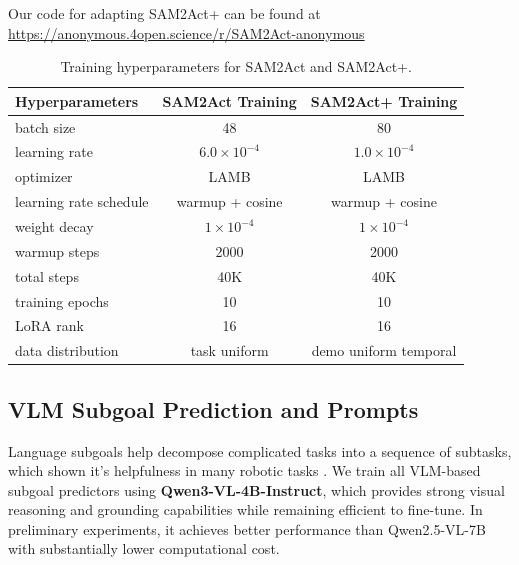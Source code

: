Our code for adapting SAM2Act+ can be found at \url{https://anonymous.4open.science/r/SAM2Act-anonymous}

\begin{table}[h]
\centering
\small
\caption{Training hyperparameters for SAM2Act and SAM2Act+.}
\label{tab:sam2actplus_train_hparams}
\begin{tabular}{lcc}
\toprule
\textbf{Hyperparameters} & \textbf{SAM2Act Training} & \textbf{SAM2Act+ Training} \\
\midrule
batch size  & 48 & 80 \\
learning rate & $6.0\times10^{-4}$ & $1.0\times10^{-4}$ \\
optimizer & LAMB  & LAMB \\
learning rate schedule & warmup + cosine & warmup + cosine \\
weight decay & $1\times10^{-4}$ & $1\times10^{-4}$ \\
warmup steps & 2000 & 2000 \\
total steps & 40K & 40K \\
training epochs & 10 & 10 \\
LoRA rank & 16 & 16 \\
data distribution & task uniform & demo uniform temporal\\
\bottomrule
\end{tabular}
\end{table}





\clearpage
\subsection{VLM Subgoal Prediction and Prompts}
\label{sec:VLM_subgoal}

Language subgoals help decompose complicated tasks into a sequence of subtasks, which shown it's helpfulness in many robotic tasks \cite{dai2025racer, lin2026systematic, dai2024think}. 
We train all VLM-based subgoal predictors using \textbf{Qwen3-VL-4B-Instruct}, which provides strong visual reasoning and grounding capabilities while remaining efficient to fine-tune. In preliminary experiments, it achieves better performance than Qwen2.5-VL-7B with substantially lower computational cost.

